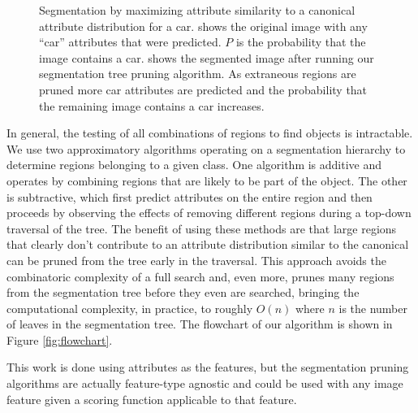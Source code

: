 \documentclass[10pt,twocolumn,letterpaper]{article}
\begin{document}
\begin{figure}
\centering
{}
\caption{Segmentation by maximizing attribute similarity to a canonical
attribute distribution for a car.   shows
the original image with any ``car'' attributes that were predicted.  $P$ is the probability
that the image contains a car.   shows the segmented image after
running our segmentation tree pruning algorithm.  As extraneous regions are pruned
more car attributes are predicted and the probability that the remaining image
contains a car increases.}
\label{fig:truck}
\end{figure}

In general, the testing of all combinations of regions to
find objects is intractable.  We use two approximatory algorithms
operating on a segmentation hierarchy to determine regions belonging
to a given class.
One algorithm is additive and operates by combining regions that are likely
to be part of the object.  The other is subtractive, which first predict attributes on
the entire region and then proceeds by observing the effects of
removing different regions during a top-down traversal of the tree.
The benefit of using these methods are that large regions that
clearly don't contribute to an attribute distribution similar to the
canonical can be pruned from
the tree early in the traversal.  This approach avoids the
combinatoric complexity of a full search and, even more, prunes many
regions from the segmentation tree before they even are searched,
bringing the computational complexity, in practice, to roughly
$O(n)$ where $n$ is the number of leaves in the segmentation tree.
The flowchart of our algorithm is shown in Figure
\ref{fig:flowchart}.

This work is done using attributes as the features, but the segmentation
pruning algorithms are actually feature-type agnostic and could be used
with any image feature given a scoring function applicable to that feature.
\end{document}
